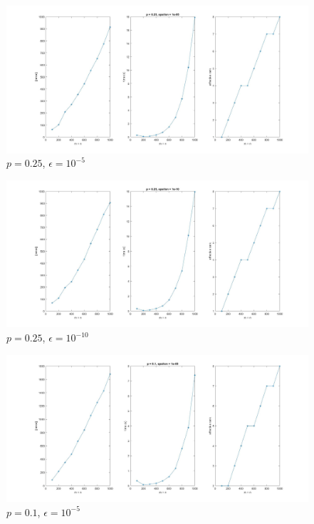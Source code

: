 \documentclass[12pt]{article}
\begin{document}
\begin{figure}[H]
    \centering
    \includegraphics[width=\textwidth]{data/p4.jpg}
    \caption{$p = 0.25$, $\epsilon = 10^{-5}$}
    \label{img1}
\end{figure}
\begin{figure}[H]
    \centering
    \includegraphics[width=\textwidth]{data/p1.jpg}
    \caption{$p = 0.25$, $\epsilon = 10^{-10}$}
    \label{img2}
\end{figure}
\begin{figure}[H]
    \centering
    \includegraphics[width=\textwidth]{data/p3.jpg}
    \caption{$p = 0.1$, $\epsilon = 10^{-5}$}
    \label{img3}
\end{figure}
\end{document}

